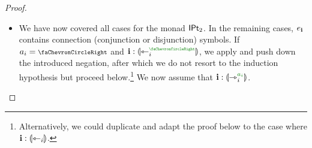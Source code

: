 \documentclass[a4paper]{memoir}
\begin{document}
\begin{proof}
\begin{itemize}
\begin{itemize}
\begin{itemize}
				
				\item If $a_i = \npolar$, then we can use  to create a morphism from $(V_0, V_1, \dm j : \rival{\edge_i})$ instead, which can be done using  (or equivalently ).
			\end{itemize}
			
			If $j > i$, then $\chi$ is necessarily a jet cube morphism $\UFsymcube_i(\UFsymcube_j(V_0), V_1) \to U$, so we can apply .
		\end{itemize}
		
		\item We have now covered all cases for the monad ${\mathsf{IPt}_2}$.
		In the remaining cases, $e_{\mathbf{i}}$ contains connection (conjunction or disjunction) symbols.
		If $a_i = \ypolar$ and $\dm i : \rival{\tej_i\pmr{\ypolar}}$, we apply  and push down the introduced negation, after which we do not resort to the induction hypothesis but proceed below.\footnote{Alternatively, we could duplicate and adapt the proof below to the case where $\mathbf{i} : {\llparenthesis \leftarrowtriangle_i \rrparenthesis}$.}
		We now assume that $\dm i : \rival{\jet_i\pmr{a_i}}$.
		
		\newcommand{\introtauxx}[0]{%
		Using \cref{thm:boolexp-to-const-assignment}, pick a bit-assignment $\tau$ of the dependencies of $t$ such that $t \psub \tau$ reduces to the neutral element $\neutralA$ of $\opA$.\footnote{If this were not possible, then $t$ would be a constant, which is in contradiction with the assumption that $e_{\dm i}$ was normal.}
		Define $\vec x$ and $\vec x'$ by overwriting $\vec v$ and $\vec v'$ with $\tau$. Then $g(\vec x) = g(\vec x') = g_0$ and $t \psub{\vec x} = t \psub{\vec x'} = \neutralA$ and $s \psub{\vec x} = s \psub{\vec v}$ and $s \psub{\vec x'} = s \psub{\vec v'}$.%
		}
		

\end{itemize}
\end{proof}
\end{document}

